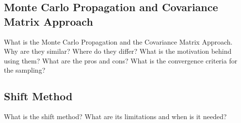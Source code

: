 \subsection{Monte Carlo Propagation and Covariance Matrix Approach}
What is the Monte Carlo Propagation and the Covariance Matrix Approach. Why are they similar? Where do they differ? What is the motivation behind using them? What are the pros and cons? What is the convergence criteria for the sampling?
\subsection{Shift Method}
What is the shift method? What are its limitations and when is it needed?
